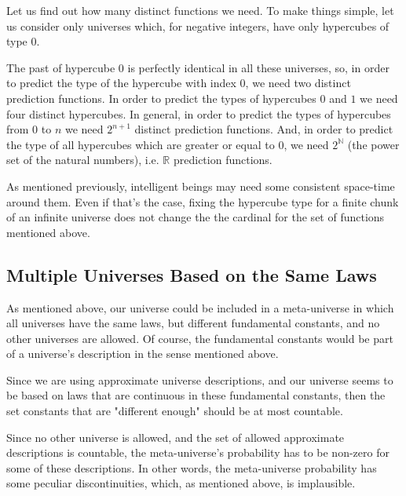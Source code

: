 \documentclass[a4paper
,draft
]{article}
\def\reale{\mathbb{R}}
\def\naturale{\mathbb{N}}
\newcommand{\ghilimele}[1]{``#1"}
\begin{document}
Let us find out how many distinct functions we need.
To make things simple, let us consider only universes which, for negative
integers, have only hypercubes of type $0$.

The past of hypercube $0$ is perfectly identical in all these universes, so,
in order to predict the type of the hypercube with index $0$,
we need two distinct prediction functions.
In order to predict the types of hypercubes $0$ and $1$ we need four
distinct hypercubes.
In general, in order to predict the types of hypercubes from $0$ to $n$
we need $2^{n+1}$ distinct prediction functions.
And, in order to predict the type of all hypercubes which are greater or equal
to $0$, we need $2^\naturale$ (the power set of the natural numbers),
i.e. $\reale$ prediction functions.

As mentioned previously, intelligent beings may need some consistent space-time
around them. Even if that's the case, fixing the hypercube type for a finite
chunk of an infinite universe does not change the the cardinal for the set of
functions mentioned above.

\subsection {Multiple Universes Based on the Same Laws}

As mentioned above, our universe could be included in a meta-universe in which
all universes have the same laws, but different fundamental constants, and no
other universes are allowed.
Of course, the fundamental constants would be part of a universe's description
in the sense mentioned above.

Since we are using approximate universe descriptions, and our universe
seems to be based on laws that are continuous in these fundamental constants,
then the set constants that are "different enough" should be at most countable.

Since no other universe is allowed, and the set of allowed approximate
descriptions is countable, the meta-universe's probability
has to be non-zero for some of these descriptions. In other words, the
meta-universe probability has some peculiar discontinuities, which, as
mentioned above, is implausible.


\end{document}
